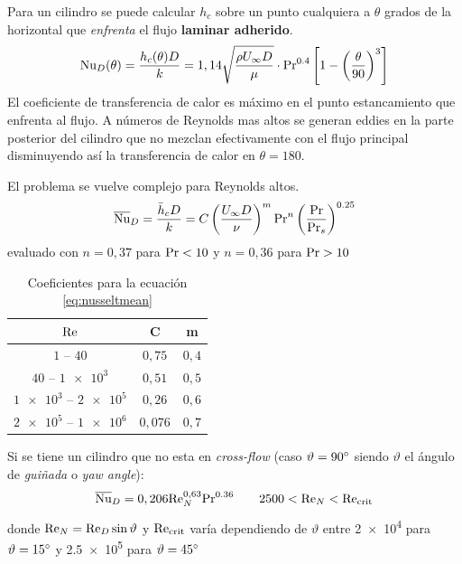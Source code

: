 Para un cilindro se puede calcular $h_c$ sobre un punto cualquiera a $\theta$ grados de la horizontal que \emph{enfrenta} el flujo \textbf{laminar adherido}. 
\begin{equation} \label{eq:nusselt}
    \textrm{Nu}_D(\theta)=\frac{h_c(\theta) D}{k}=1,14\sqrt{\frac{\rho U_\infty D}{\mu}}\cdot \textrm{Pr}^{0.4} \left[ 1- \left(\frac{\theta}{90}\right)^3 \right] 
\end{equation}
El coeficiente de transferencia de calor es máximo en el punto estancamiento que enfrenta al flujo. A números de Reynolds mas altos se generan eddies en la parte posterior del cilindro que no mezclan efectivamente con el flujo principal disminuyendo así la transferencia de calor en $\theta=180$.

El problema se vuelve complejo para Reynolds altos. 
\begin{equation} \label{eq:nusseltmean}
    \overline{\textrm{Nu}}_D=\frac{\bar{h}_c D}{k}=C\left(\frac{U_\infty D}{\nu}\right)^m \textrm{Pr}^n \left( \frac{\textrm{Pr}}{\textrm{Pr}_s}\right)^{0.25}
\end{equation}
evaluado con $n=0,37$ para $\textrm{Pr}<10$ y $n=0,36$ para $\textrm{Pr}>10$ 

\begin{table}[h]
\centering
\begin{tabular}{ccc}
\hline
$\textrm{Re}$                & C     & m   \\\hline
$1$ -- $40$              & $0,75$  & $0,4$ \\
$40$ -- $\num{1e3}$           & $0,51$  & $0,5 $\\
$\num{1e3}$ -- $\num{2e5}$      & $0,26$  & $0,6$ \\
$\num{2e5}$ -- $\num{1e6}$ & $0,076$ & $0,7$\\\hline
\end{tabular}
\label{tab:coeficientes1}
\caption{Coeficientes para la ecuación \ref{eq:nusseltmean}}
\end{table}

Si se tiene un cilindro que no esta en \emph{cross-flow} (caso $\vartheta=90^{\circ}$ siendo $\vartheta$ el ángulo de \emph{guiñada} o \emph{yaw angle}):
\begin{equation}
    \overline{\textrm{Nu}}_D=0,206\textrm{Re}^{0,63}_N \textrm{Pr}^{0.36} \qquad 2500<\textrm{Re}_N<\textrm{Re}_{\mathrm{crit}}
\end{equation}
donde $\textrm{Re}_N=\textrm{Re}_D \sin \vartheta $ y $\textrm{Re}_{\mathrm{crit}}$ varía dependiendo de $\vartheta$ entre \num{2e4} para $\vartheta=15^{\circ}$ y \num{2.5e5} para $\vartheta=45^{\circ}$

